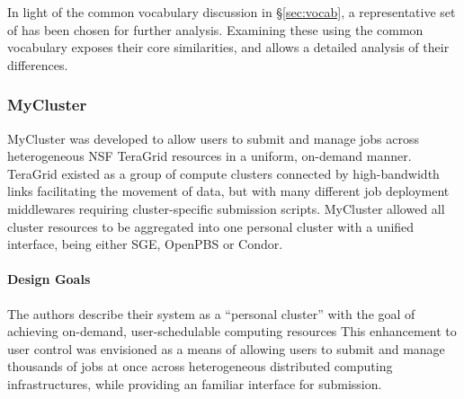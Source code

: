 \documentclass{sig-alternate}
\begin{document}
In light of the common vocabulary discussion in \S\ref{sec:vocab}, a
representative set of \pilotjobs has been chosen for further analysis.
Examining these \pilotjobs using the common vocabulary exposes their
core similarities, and allows a detailed analysis of their
differences.



\subsubsection{MyCluster}

MyCluster was developed to allow users to submit and manage
jobs across heterogeneous NSF TeraGrid resources in a uniform,
on-demand manner.  TeraGrid existed as a group of compute clusters
connected by high-bandwidth links facilitating the movement
of data, but with many different job deployment middlewares
requiring cluster-specific submission scripts.  MyCluster
allowed all cluster resources to be aggregated into one personal cluster with
a unified interface, being either SGE, OpenPBS or Condor.


\paragraph{Design Goals}
The authors describe their system as a ``personal cluster'' with the goal of
achieving on-demand, user-schedulable computing resources
This enhancement to user control was envisioned as a means of allowing users to
submit and manage thousands of jobs at once across heterogeneous distributed
computing infrastructures, while providing an familiar interface for
submission.
\end{document}
